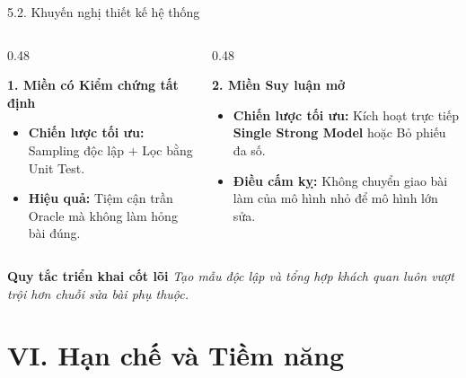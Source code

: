\documentclass[aspectratio=169,10pt]{beamer}
\begin{document}
\begin{frame}{5.2. Khuyến nghị thiết kế hệ thống}
  \begin{columns}[t]
    \begin{column}{0.48\textwidth}
      \begin{exampleblock}{\textbf{1. Miền có Kiểm chứng tất định}}
        \begin{itemize}\small
          \item \textbf{Chiến lược tối ưu:} Sampling độc lập $+$ Lọc bằng Unit Test.
          \item \textbf{Hiệu quả:} Tiệm cận trần Oracle mà không làm hỏng bài đúng.
        \end{itemize}
      \end{exampleblock}
    \end{column}
    
    \begin{column}{0.48\textwidth}
      \begin{alertblock}{\textbf{2. Miền Suy luận mở}}
        \begin{itemize}\small
          \item \textbf{Chiến lược tối ưu:} Kích hoạt trực tiếp \textbf{Single Strong Model} hoặc Bỏ phiếu đa số.
          \item \textbf{Điều cấm kỵ:} Không chuyển giao bài làm của mô hình nhỏ để mô hình lớn sửa.
        \end{itemize}
      \end{alertblock}
    \end{column}
  \end{columns}
  
  \vspace{6pt}
  \begin{block}{\textbf{Quy tắc triển khai cốt lõi}}
    \centering\small
    \emph{Tạo mẫu độc lập và tổng hợp khách quan luôn vượt trội hơn chuỗi sửa bài phụ thuộc.}
  \end{block}
\end{frame}

\section{VI. Hạn chế và Tiềm năng}
\end{document}
